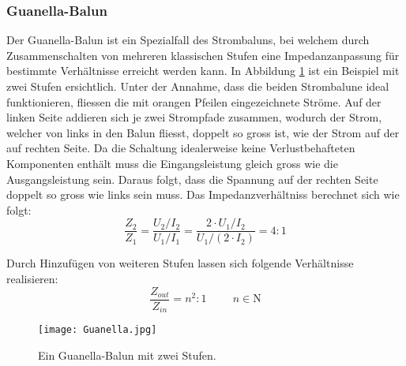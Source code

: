 \newpage
\subsubsection{Guanella-Balun}
Der Guanella-Balun ist ein Spezialfall des Strombaluns, bei welchem durch Zusammenschalten von mehreren klassischen Stufen eine Impedanzanpassung für bestimmte Verhältnisse erreicht werden kann. In Abbildung \ref{fig:Guanella} ist ein Beispiel mit zwei Stufen ersichtlich. Unter der Annahme, dass die beiden Strombalune ideal funktionieren, fliessen die mit orangen Pfeilen eingezeichnete Ströme. Auf der linken Seite addieren sich je zwei Strompfade zusammen, wodurch der Strom, welcher von links in den Balun fliesst, doppelt so gross ist, wie der Strom auf der auf rechten Seite. Da die Schaltung idealerweise keine Verlustbehafteten Komponenten enthält muss die Eingangsleistung gleich gross wie die Ausgangsleistung sein. Daraus folgt, dass die Spannung auf der rechten Seite doppelt so gross wie links sein muss. Das Impedanzverhältniss berechnet sich wie folgt:
\begin{equation}
\frac{Z_2}{Z_1}=\frac{U_2/I_2}{U_1/I_1}=\frac{2\cdot U_1/I_2}{U_1/(2\cdot I_2)}=4:1
\label{equ:Guanella_1}
\end{equation}

Durch Hinzufügen von weiteren Stufen lassen sich folgende Verhältnisse realisieren:
\begin{equation}
	\frac{Z_{out}}{Z_{in}}=n^{2}:1 \hspace{1cm} n\in\mathrm{N}
\end{equation}
\begin{figure}[H]
	\centering
	\texttt{[image: Guanella.jpg]}
	\caption{Ein Guanella-Balun mit zwei Stufen.}\label{fig:Guanella}
\end{figure}